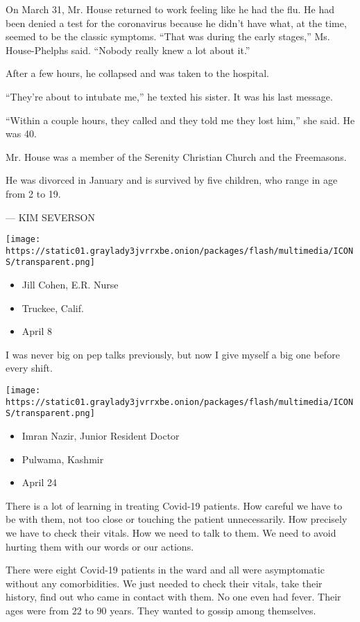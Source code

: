 On March 31, Mr. House returned to work feeling like he had the flu. He
had been denied a test for the coronavirus because he didn't have what,
at the time, seemed to be the classic symptoms. ``That was during the
early stages,'' Ms. House-Phelphs said. ``Nobody really knew a lot about
it.''

After a few hours, he collapsed and was taken to the hospital.

``They're about to intubate me,'' he texted his sister. It was his last
message.

``Within a couple hours, they called and they told me they lost him,''
she said. He was 40.

Mr. House was a member of the Serenity Christian Church and the
Freemasons.

He was divorced in January and is survived by five children, who range
in age from 2 to 19.

--- KIM SEVERSON

\texttt{[image: https://static01.graylady3jvrrxbe.onion/packages/flash/multimedia/ICONS/transparent.png]}

\begin{itemize}
\tightlist
\item
  Jill Cohen, E.R. Nurse
\item
  Truckee, Calif.
\item
  April 8
\end{itemize}

I was never big on pep talks previously, but now I give myself a big one
before every shift.

\texttt{[image: https://static01.graylady3jvrrxbe.onion/packages/flash/multimedia/ICONS/transparent.png]}

\begin{itemize}
\tightlist
\item
  Imran Nazir, Junior Resident Doctor
\item
  Pulwama, Kashmir
\item
  April 24
\end{itemize}

There is a lot of learning in treating Covid-19 patients. How careful we
have to be with them, not too close or touching the patient
unnecessarily. How precisely we have to check their vitals. How we need
to talk to them. We need to avoid hurting them with our words or our
actions.

There were eight Covid-19 patients in the ward and all were asymptomatic
without any comorbidities. We just needed to check their vitals, take
their history, find out who came in contact with them. No one even had
fever. Their ages were from 22 to 90 years. They wanted to gossip among
themselves.

